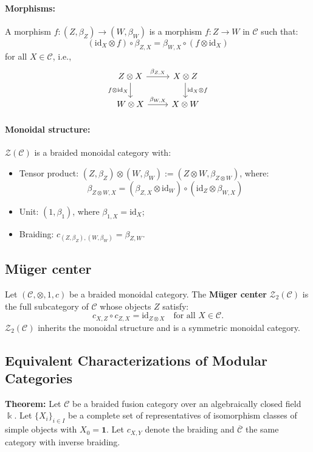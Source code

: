 \documentclass[11pt]{article}
\theoremstyle{definition}
\begin{document}
\paragraph{Morphisms:} A morphism \( f: (Z, \beta_Z) \to (W, \beta_W) \) is a morphism \( f: Z \to W \) in \( \mathcal{C} \) such that:
\[
(\text{id}_X \otimes f) \circ \beta_{Z,X} = \beta_{W,X} \circ (f \otimes \text{id}_X)
\]
for all \( X \in \mathcal{C} \), i.e.,
\[
\begin{tikzcd}
Z \otimes X \arrow[r, "\beta_{Z,X}"] \arrow[d, "f \otimes \text{id}_X"'] & X \otimes Z \arrow[d, "\text{id}_X \otimes f"] \\
W \otimes X \arrow[r, "\beta_{W,X}"] & X \otimes W
\end{tikzcd}
\]

\paragraph{Monoidal structure:} \( \mathcal{Z}(\mathcal{C}) \) is a braided monoidal category with:
\begin{itemize}
  \item Tensor product: \( (Z, \beta_Z) \otimes (W, \beta_W) := (Z \otimes W, \beta_{Z \otimes W}) \), where:
  \[
  \beta_{Z \otimes W, X} = (\beta_{Z,X} \otimes \text{id}_W) \circ (\text{id}_Z \otimes \beta_{W,X})
  \]
  \item Unit: \( (1, \beta_1) \), where \( \beta_{1,X} = \text{id}_X \);
  \item Braiding: \( c_{(Z,\beta_Z), (W,\beta_W)} = \beta_{Z,W} \).
\end{itemize}

\subsection{M\"uger center}
Let \( (\mathcal{C}, \otimes, 1, c) \) be a braided monoidal category. The \textbf{M\"uger center} \( \mathcal{Z}_2(\mathcal{C}) \) is the full subcategory of \( \mathcal{C} \) whose objects \( Z \) satisfy:
\[
c_{X,Z} \circ c_{Z,X} = \text{id}_{Z \otimes X} \quad \text{for all } X \in \mathcal{C}.
\]
\( \mathcal{Z}_2(\mathcal{C}) \) inherits the monoidal structure and is a symmetric monoidal category.

\subsection{Equivalent Characterizations of Modular Categories}
\textbf{Theorem: } Let \( \mathcal{C} \) be a braided fusion category over an algebraically closed field \( \Bbbk \). Let \( \{X_i\}_{i \in I} \) be a complete set of representatives of isomorphism classes of simple objects with \( X_0 = \mathbf{1} \). Let \( c_{X,Y} \) denote the braiding and \( \overline{\mathcal{C}} \) the same category with inverse braiding.
\end{document}
